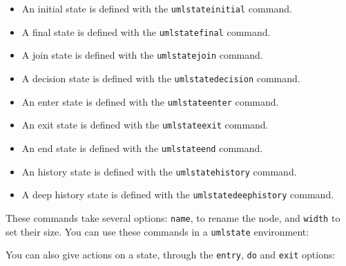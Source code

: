 \documentclass[a4paper,11pt]{report}
\begin{document}
\begin{itemize}
\item An initial state is defined with the {\tt umlstateinitial} command.
\item A final state is defined with the {\tt umlstatefinal} command.
\item A join state is defined with the {\tt umlstatejoin} command.
\item A decision state is defined with the {\tt umlstatedecision} command.
\item An enter state is defined with the {\tt umlstateenter} command.
\item An exit state is defined with the {\tt umlstateexit} command.
\item An end state is defined with the {\tt umlstateend} command.
\item An history state is defined with the {\tt umlstatehistory} command.
\item A deep history state is defined with the {\tt umlstatedeephistory} command.
\end{itemize}

\medskip

These commands take several options: {\tt name}, to rename the node, and {\tt width} to set their size. You can use these commands in a {\tt umlstate} environment:

\medskip

\begin{minipage}{0.51\textwidth}

\end{minipage}
\begin{minipage}{0.49\textwidth}
\begin{center}
\end{center}
\end{minipage}

\medskip

You can also give actions on a state, through the {\tt entry}, {\tt do} and {\tt exit} options:

\medskip

\begin{minipage}{0.51\textwidth}

\end{minipage}
\begin{minipage}{0.49\textwidth}
\begin{center}
\end{center}
\end{minipage}
\end{document}
